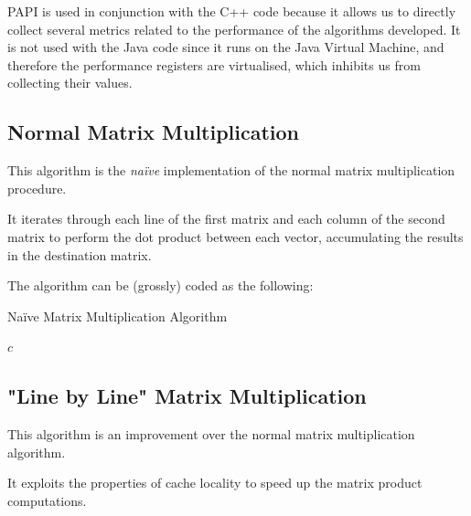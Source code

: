 \documentclass[11pt,a4paper]{article}
\begin{document}
PAPI is used in conjunction with the C++ code because it allows us to directly collect several metrics related to the performance of the algorithms developed.
It is not used with the Java code since it runs on the Java Virtual Machine, and therefore the performance registers are virtualised, which inhibits us from collecting their values.

\subsection{Normal Matrix Multiplication}

This algorithm is the \emph{naïve} implementation of the normal matrix multiplication procedure.

It iterates through each line of the first matrix and each column of the second matrix to perform the dot product between each vector, accumulating the results in the destination matrix.

The algorithm can be (grossly) coded as the following:

\begin{algorithm}[H]
    \caption{Naïve Matrix Multiplication Algorithm}
    \begin{algorithmic}[1]
                    \EndFor
                \EndFor
            \EndFor
            \State \Return $c$
        \EndFunction
    \end{algorithmic}
\end{algorithm}

\subsection{"Line by Line" Matrix Multiplication}

This algorithm is an improvement over the normal matrix multiplication algorithm.

It exploits the properties of cache locality to speed up the matrix product computations.
\end{document}
